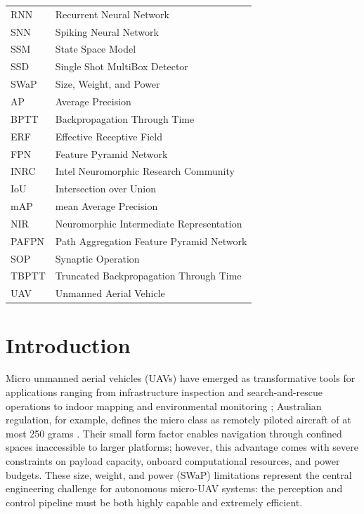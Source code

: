 \documentclass[11pt, a4paper]{report}
\newcounter{frontmatterpages}
\begin{document}
\begin{tabular}{ll}
RNN & Recurrent Neural Network \\
SNN & Spiking Neural Network \\
SSM & State Space Model \\
SSD & Single Shot MultiBox Detector \\
SWaP & Size, Weight, and Power \\
AP & Average Precision \\
BPTT & Backpropagation Through Time \\
ERF & Effective Receptive Field \\
FPN & Feature Pyramid Network \\
INRC & Intel Neuromorphic Research Community \\
IoU & Intersection over Union \\
mAP & mean Average Precision \\
NIR & Neuromorphic Intermediate Representation \\
PAFPN & Path Aggregation Feature Pyramid Network \\
SOP & Synaptic Operation \\
TBPTT & Truncated Backpropagation Through Time \\
UAV & Unmanned Aerial Vehicle \\
\end{tabular}

\clearpage
\setcounter{frontmatterpages}{\value{page}}

\chapter{Introduction}
\label{ch:intro}
Micro unmanned aerial vehicles (UAVs) have emerged as transformative tools for applications ranging from infrastructure inspection and search-and-rescue operations to indoor mapping and environmental monitoring \cite{floreano2015science}; Australian regulation, for example, defines the micro class as remotely piloted aircraft of at most 250 grams \cite{casa2021part101}. Their small form factor enables navigation through confined spaces inaccessible to larger platforms; however, this advantage comes with severe constraints on payload capacity, onboard computational resources, and power budgets. These size, weight, and power (SWaP) limitations represent the central engineering challenge for autonomous micro-UAV systems: the perception and control pipeline must be both highly capable and extremely efficient.
\end{document}
